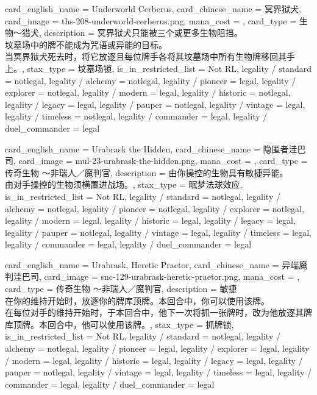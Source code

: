 \documentclass[lang = cn, color = black, 10pt]{AllThatStax}
\begin{document}
\card
{
	card_english_name = {Underworld Cerberus},
	card_chinese_name = {冥界狱犬},
	card_image = ths-208-underworld-cerberus.png,
	mana_cost = ,
	card_type = 生物～猎犬,
	description = {冥界狱犬只能被三个或更多生物阻挡。\\
		坟墓场中的牌不能成为咒语或异能的目标。\\
		当冥界狱犬死去时，将它放逐且每位牌手各将其坟墓场中所有生物牌移回其手上。},
	stax_type = 坟墓场锁,
	is_in_restricted_list = Not RL,
	legality / standard = notlegal,
	legality / alchemy = notlegal,
	legality / pioneer = legal,
	legality / explorer = notlegal,
	legality / modern = legal,
	legality / historic = notlegal,
	legality / legacy = legal,
	legality / pauper = notlegal,
	legality / vintage = legal,
	legality / timeless = notlegal,
	legality / commander = legal,
	legality / duel_commander = legal
}

\card
{
	card_english_name = {Urabrask the Hidden},
	card_chinese_name = {隐匿者洼巴司},
	card_image = mul-23-urabrask-the-hidden.png,
	mana_cost = ,
	card_type = 传奇生物 ～非瑞人／魔判官,
	description = {由你操控的生物具有敏捷异能。\\
		由对手操控的生物须横置进战场。},
	stax_type = 眠梦法球效应,
	is_in_restricted_list = Not RL,
	legality / standard = notlegal,
	legality / alchemy = notlegal,
	legality / pioneer = notlegal,
	legality / explorer = notlegal,
	legality / modern = legal,
	legality / historic = legal,
	legality / legacy = legal,
	legality / pauper = notlegal,
	legality / vintage = legal,
	legality / timeless = legal,
	legality / commander = legal,
	legality / duel_commander = legal
}

\card
{
	card_english_name = {Urabrask, Heretic Praetor},
	card_chinese_name = {异端魔判洼巴司},
	card_image = snc-129-urabrask-heretic-praetor.png,
	mana_cost = ,
	card_type = 传奇生物 ～非瑞人／魔判官,
	description = {敏捷\\
		在你的维持开始时，放逐你的牌库顶牌。本回合中，你可以使用该牌。\\
		在每位对手的维持开始时，于本回合中，他下一次将抓一张牌时，改为他放逐其牌库顶牌。本回合中，他可以使用该牌。},
	stax_type = 抓牌锁,
	is_in_restricted_list = Not RL,
	legality / standard = notlegal,
	legality / alchemy = notlegal,
	legality / pioneer = legal,
	legality / explorer = legal,
	legality / modern = legal,
	legality / historic = legal,
	legality / legacy = legal,
	legality / pauper = notlegal,
	legality / vintage = legal,
	legality / timeless = legal,
	legality / commander = legal,
	legality / duel_commander = legal
}
\end{document}
